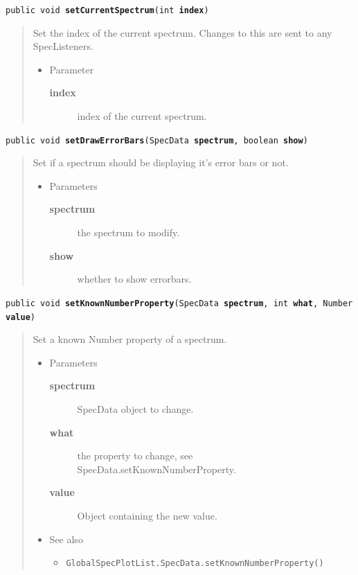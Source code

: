 \documentclass[twoside,11pt]{article}
\renewcommand{\_}{\texttt{\symbol{95}}}
\newcommand{\refdefined}[1]{}
\newcommand{\method}[1]{\texttt{#1}}
\newenvironment{desc}{\begin{quote}}{\end{quote}}
\begin{document}
\method{public void \textbf{setCurrentSpectrum}(\texttt{int} \textbf{index})\label{l323}\label{l324}}
\begin{desc}Set the index of the current spectrum. Changes to this are
 sent to any SpecListeners.
\begin{itemize}
\item{Parameter
  \begin{description}
   \item[\textbf{index}]{index of the current spectrum.}
  \end{description}}
\end{itemize}
\end{desc}

\method{public void \textbf{setDrawErrorBars}(\texttt{SpecData} \textbf{spectrum}, \texttt{boolean} \textbf{show})\label{l325}\label{l326}}
\begin{desc}Set if a spectrum should be displaying it's error bars or
  not.
\begin{itemize}
\item{Parameters
  \begin{description}
   \item[\textbf{spectrum}]{the spectrum to modify.}
   \item[\textbf{show}]{whether to show errorbars.}
  \end{description}}
\end{itemize}
\end{desc}

\method{public void \textbf{setKnownNumberProperty}(\texttt{SpecData} \textbf{spectrum}, \texttt{int} \textbf{what}, \texttt{Number} \textbf{value})\label{l327}\label{l328}}
\begin{desc}Set a known Number property of a spectrum.
\begin{itemize}
\item{Parameters
  \begin{description}
   \item[\textbf{spectrum}]{SpecData object to change.}
   \item[\textbf{what}]{the property to change, see
               SpecData.setKnownNumberProperty.}
   \item[\textbf{value}]{Object containing the new value.}
  \end{description}}
\end{itemize}
\begin{itemize}
\item{{See also}
  \begin{itemize}
   \item{\texttt{GlobalSpecPlotList.SpecData.setKnownNumberProperty()} {
\refdefined{l329}}
}
  \end{itemize}
}
\end{itemize}
\end{desc}
\end{document}
